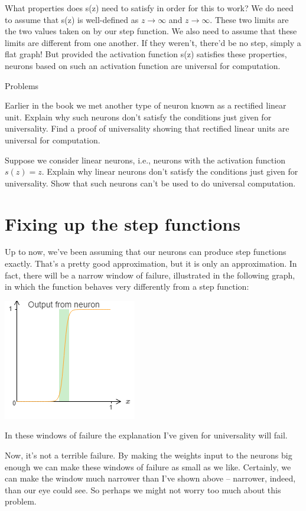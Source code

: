 \documentclass[a4paper,twoside,10pt]{book}
\begin{document}
What properties does s(z) need to satisfy in order for this to work? We do need to assume that s(z) is well-defined as $z\to\infty$ and $z\to\infty$. These two limits are the two values taken on by our step function. We also need to assume that these limits are different from one another. If they weren't, there'd be no step, simply a flat graph! But provided the activation function s(z) satisfies these properties, neurons based on such an activation function are universal for computation.

\begin{exercize}{Problems}
\item Earlier in the book we met another type of neuron known as a rectified linear unit. Explain why such neurons don't satisfy the conditions just given for universality. Find a proof of universality showing that rectified linear units are universal for computation.
\item Suppose we consider linear neurons, i.e., neurons with the activation function $s(z)=z$. Explain why linear neurons don't satisfy the conditions just given for universality. Show that such neurons can't be used to do universal computation.
\end{exercize}
\section{Fixing up the step functions}
Up to now, we've been assuming that our neurons can produce step functions exactly. That's a pretty good approximation, but it is only an approximation. In fact, there will be a narrow window of failure, illustrated in the following graph, in which the function behaves very differently from a step function:
\begin{center}
	\includegraphics[width=0.4\linewidth]{figures/ch4/tikz453}
\end{center}
In these windows of failure the explanation I've given for universality will fail.

Now, it's not a terrible failure. By making the weights input to the neurons big enough we can make these windows of failure as small as we like. Certainly, we can make the window much narrower than I've shown above -- narrower, indeed, than our eye could see. So perhaps we might not worry too much about this problem.
\end{document}
